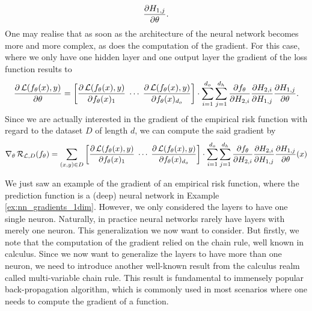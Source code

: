 \begin{example}
\begin{enumerate}
\begin{align*}
\frac{\partial H_{1,j}}{\partial \theta}.
\end{align*}
One may realise that as soon as the architecture of the neural network becomes more and more complex, as does the computation of the gradient. For this case, where we only have one hidden layer and one output layer the gradient of the loss function results to
\begin{align*}
\frac{\partial \operatorname{\mathcal{L}}(f_{\theta}(x), y)}{\partial \theta} = \left[\begin{matrix}
\displaystyle\frac{\partial \operatorname{\mathcal{L}}(f_{\theta}(x), y)}{\partial f_{\theta}(x)_1}\; \cdots\; \frac{\partial \operatorname{\mathcal{L}}(f_{\theta}(x), y)}{\partial f_{\theta}(x)_{d_o}}
\end{matrix} \right] \cdot \sum_{i=1}^{d_o} \sum_{j=1}^{d_h} \frac{\partial f_{\theta}}{\partial H_{2,i}} \frac{\partial H_{2,i}}{\partial H_{1,j}}
\frac{\partial H_{1,j}}{\partial \theta}.
\end{align*}
Since we are actually interested in the gradient of the empirical risk function with regard to the dataset $D$ of length $d$, we can compute the said gradient by
\begin{align*}
\nabla_{\theta} \operatorname{\mathcal{R}}_{\operatorname{\mathcal{L}}, D} (f_{\theta}) = \sum_{(x, y)\in D} \left[\begin{matrix}
\displaystyle\frac{\partial \operatorname{\mathcal{L}}(f_{\theta}(x), y)}{\partial f_{\theta}(x)_1}\; \cdots\; \frac{\partial \operatorname{\mathcal{L}}(f_{\theta}(x), y)}{\partial f_{\theta}(x)_{d_o}}
\end{matrix} \right] \cdot \sum_{i=1}^{d_o} \sum_{j=1}^{d_h} \frac{\partial f_{\theta}}{\partial H_{2,i}} \frac{\partial H_{2,i}}{\partial H_{1,j}}
\frac{\partial H_{1,j}}{\partial \theta} (x)
\end{align*}
\fi
\end{enumerate}
\end{example}

We just saw an example of the gradient of an empirical risk function, where the prediction function is a (deep) neural network in Example \ref{ex:nn_gradients_1dim}. However, we only considered the layers to have one single neuron. Naturally, in practice neural networks rarely have layers with merely one neuron. This generalization we now want to consider. But firstly, we note that the computation of the gradient relied on the chain rule, well known in calculus. Since we now want to generalize the layers to have more than one neuron, we need to introduce another well-known result from the calculus realm called multi-variable chain rule. This result is fundamental to immensely popular back-propagation algorithm, which is commonly used in most scenarios where one needs to compute the gradient of a function.

